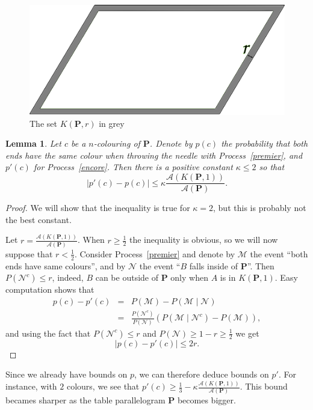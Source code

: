 \documentclass[a4paper,11pt]{article}
\newtheorem{lemma}{Lemma}
\theoremstyle{definition}
\theoremstyle{remark}
\begin{document}
\begin{figure}[h]
\center
\includegraphics[scale=0.5]{tablefinie.png}
\caption{\label{tablefinie} The set $K(\mathbf{P},r)$ in grey}
\end{figure}

\begin{lemma}
Let $c$ be a $n$-colouring of $\mathbf{P}$. Denote by $p(c)$ the probability 
that both ends have the same colour when throwing 
the needle with Process~\ref{premier}, and $p'(c)$ for Process~\ref{encore}. Then 
there is a positive constant $\kappa \leq 2$ so that 
$$ | p'(c) - p(c)| \leq \kappa \frac{\mathcal{A}(K(\mathbf{P},1))}{\mathcal{A}(\mathbf{P})}.$$
\end{lemma}

\begin{proof}
We will show that the inequality is true for $\kappa =2$, but this is probably 
not the best constant.

Let $r = \frac{\mathcal{A}(K(\mathbf{P},1))}{\mathcal{A}(\mathbf{P})}$. When 
$r \geq \frac12$ the inequality is obvious, so we will now suppose that 
$r < \frac12$. Consider Process~\ref{premier} and denote by $\mathcal{M}$ the 
event ``both ends have same colours'', and by $\mathcal{N}$ the event ``$B$ 
falls inside of $\mathbf{P}$''. Then $P(\mathcal{N}^c) \leq r$, indeed, $B$ can 
be outside of $\mathbf{P}$ only
when $A$ is in $K(\mathbf{P},1)$. Easy computation shows that
\begin{eqnarray*}
p(c) - p'(c) & = & P(\mathcal{M}) - P(\mathcal{M} \mid \mathcal{N}) \\
& = & \frac{P(\mathcal{N}^c)}{P(\mathcal{N})} \left( P(\mathcal{M}\mid \mathcal{N}^c) - P(\mathcal{M})\right),
\end{eqnarray*}
and using the fact that $P(\mathcal{N}^c) \leq r$ and 
$P(\mathcal{N}) \geq 1-r \geq \frac12$ we get 
$$ |p(c) - p'(c)| \leq 2r.$$
\end{proof}

Since we already have bounds on $p$, we can therefore deduce bounds on $p'$.
For instance, with $2$ colours, we see that 
$p'(c) \geq \frac13 - \kappa \frac{\mathcal{A}(K(\mathbf{P},1))}{\mathcal{A}(\mathbf{P})}$. 
This bound becames sharper as the table parallelogram $\mathbf{P}$ becomes bigger.
\end{document}
